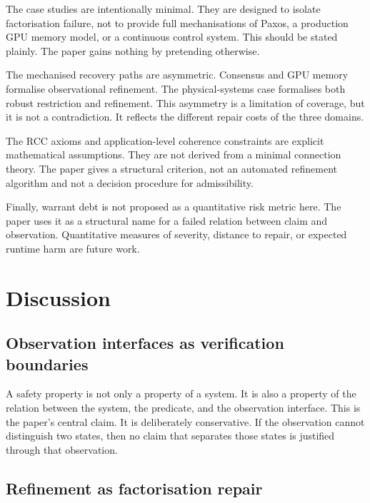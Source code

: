 \documentclass[a4paper,11pt]{article}
\begin{document}
The case studies are intentionally minimal. They are designed to isolate
factorisation failure, not to provide full mechanisations of Paxos, a
production GPU memory model, or a continuous control system. This should be
stated plainly. The paper gains nothing by pretending otherwise.

The mechanised recovery paths are asymmetric. Consensus and GPU memory
formalise observational refinement. The physical-systems case formalises both
robust restriction and refinement. This asymmetry is a limitation of coverage,
but it is not a contradiction. It reflects the different repair costs of the
three domains.

The RCC axioms and application-level coherence constraints are explicit
mathematical assumptions. They are not derived from a minimal connection theory.
The paper gives a structural criterion, not an automated refinement algorithm
and not a decision procedure for admissibility.

Finally, warrant debt is not proposed as a quantitative risk metric here. The
paper uses it as a structural name for a failed relation between claim and
observation. Quantitative measures of severity, distance to repair, or expected
runtime harm are future work.

\section{Discussion}
\label{sec:discussion}

\subsection{Observation interfaces as verification boundaries}

A safety property is not only a property of a system. It is also a property of
the relation between the system, the predicate, and the observation interface.
This is the paper's central claim. It is deliberately conservative. If the
observation cannot distinguish two states, then no claim that separates those
states is justified through that observation.

\subsection{Refinement as factorisation repair}
\end{document}
